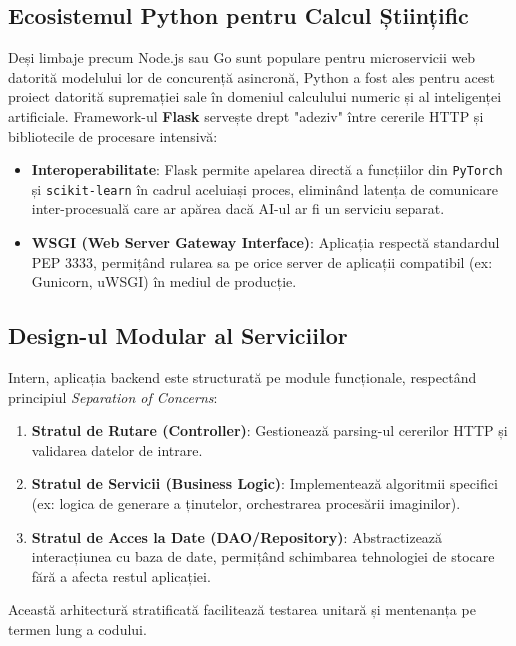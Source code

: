 \subsection{Ecosistemul Python pentru Calcul Științific}
Deși limbaje precum Node.js sau Go sunt populare pentru microservicii web datorită modelului lor de concurență asincronă, Python a fost ales pentru acest proiect datorită supremației sale în domeniul calculului numeric și al inteligenței artificiale.
Framework-ul \textbf{Flask} servește drept "adeziv" între cererile HTTP și bibliotecile de procesare intensivă:
\begin{itemize}
    \item \textbf{Interoperabilitate}: Flask permite apelarea directă a funcțiilor din \texttt{PyTorch} și \texttt{scikit-learn} în cadrul aceluiași proces, eliminând latența de comunicare inter-procesuală care ar apărea dacă AI-ul ar fi un serviciu separat.
    \item \textbf{WSGI (Web Server Gateway Interface)}: Aplicația respectă standardul PEP 3333, permițând rularea sa pe orice server de aplicații compatibil (ex: Gunicorn, uWSGI) în mediul de producție.
\end{itemize}

\subsection{Design-ul Modular al Serviciilor}
Intern, aplicația backend este structurată pe module funcționale, respectând principiul \textit{Separation of Concerns}:
\begin{enumerate}
    \item \textbf{Stratul de Rutare (Controller)}: Gestionează parsing-ul cererilor HTTP și validarea datelor de intrare.
    \item \textbf{Stratul de Servicii (Business Logic)}: Implementează algoritmii specifici (ex: logica de generare a ținutelor, orchestrarea procesării imaginilor).
    \item \textbf{Stratul de Acces la Date (DAO/Repository)}: Abstractizează interacțiunea cu baza de date, permițând schimbarea tehnologiei de stocare fără a afecta restul aplicației.
\end{enumerate}
Această arhitectură stratificată facilitează testarea unitară și mentenanța pe termen lung a codului.